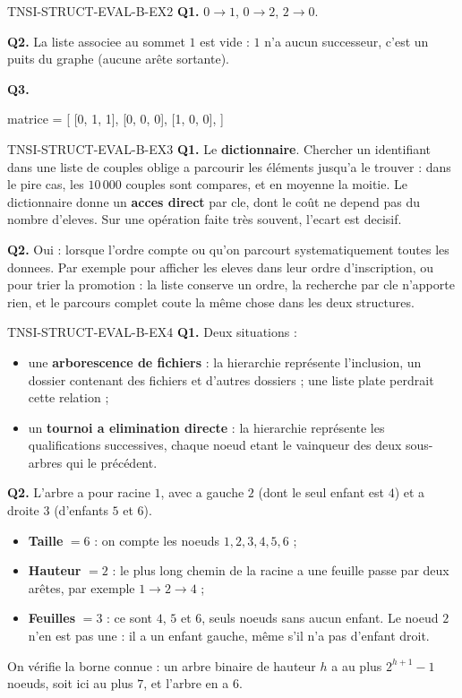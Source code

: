 \begin{corrige}{TNSI-STRUCT-EVAL-B-EX2}
\textbf{Q1.} $0\to1$, $0\to2$, $2\to0$.

\textbf{Q2.} La liste associee au sommet $1$ est vide : $1$ n'a aucun successeur, c'est un puits du graphe (aucune arête sortante).

\textbf{Q3.}
\begin{python}
matrice = [
    [0, 1, 1],
    [0, 0, 0],
    [1, 0, 0],
]
\end{python}
\end{corrige}

\begin{corrige}{TNSI-STRUCT-EVAL-B-EX3}
\textbf{Q1.} Le \textbf{dictionnaire}. Chercher un identifiant dans une liste de couples
oblige a parcourir les éléments jusqu'a le trouver : dans le pire cas, les $10\,000$ couples
sont compares, et en moyenne la moitie. Le dictionnaire donne un \textbf{acces direct} par
cle, dont le coût ne depend pas du nombre d'eleves. Sur une opération faite très souvent,
l'ecart est decisif.

\textbf{Q2.} Oui : lorsque l'ordre compte ou qu'on parcourt systematiquement toutes les
donnees. Par exemple pour afficher les eleves dans leur ordre d'inscription, ou pour trier
la promotion : la liste conserve un ordre, la recherche par cle n'apporte rien, et le
parcours complet coute la même chose dans les deux structures.

\end{corrige}

\begin{corrige}{TNSI-STRUCT-EVAL-B-EX4}
\textbf{Q1.} Deux situations :
\begin{itemize}
  \item une \textbf{arborescence de fichiers} : la hierarchie représente l'inclusion, un
  dossier contenant des fichiers et d'autres dossiers ; une liste plate perdrait cette
  relation ;
  \item un \textbf{tournoi a elimination directe} : la hierarchie représente les
  qualifications successives, chaque noeud etant le vainqueur des deux sous-arbres qui le
  précédent.
\end{itemize}

\textbf{Q2.} L'arbre a pour racine $1$, avec a gauche $2$ (dont le seul enfant est $4$) et a
droite $3$ (d'enfants $5$ et $6$).
\begin{itemize}
  \item \textbf{Taille} $=6$ : on compte les noeuds $1, 2, 3, 4, 5, 6$ ;
  \item \textbf{Hauteur} $=2$ : le plus long chemin de la racine a une feuille passe par
  deux arêtes, par exemple $1\to2\to4$ ;
  \item \textbf{Feuilles} $=3$ : ce sont $4$, $5$ et $6$, seuls noeuds sans aucun enfant. Le
  noeud $2$ n'en est pas une : il a un enfant gauche, même s'il n'a pas d'enfant droit.
\end{itemize}
On vérifie la borne connue : un arbre binaire de hauteur $h$ a au plus $2^{h+1}-1$ noeuds,
soit ici au plus $7$, et l'arbre en a $6$.
\end{corrige}
